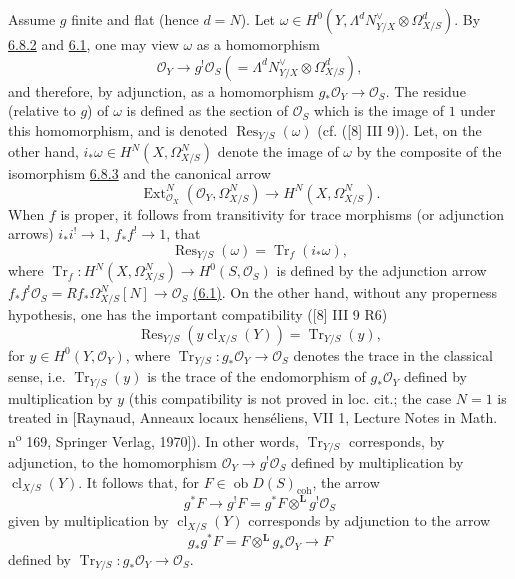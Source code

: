 \documentclass[11pt]{article}
\DeclareMathOperator{\Ext}{Ext}
\newcommand{\ob}{\operatorname{ob}}
\providecommand{\cl}{\operatorname{cl}}
\providecommand{\OO}{\mathcal{O}}
\providecommand{\LL}{\mathbf L}
\providecommand{\coh}{\mathrm{coh}}
\providecommand{\ob}{\operatorname{ob}}
\providecommand{\cl}{\operatorname{cl}}
\providecommand{\coh}{\mathrm{coh}}
\providecommand{\cl}{\operatorname{cl}}
\begin{document}
Assume $g$ finite and flat (hence $d=N$). Let $\omega\in H^0(Y,\Lambda^d N_{Y/X}^{\vee}\otimes\Omega^d_{X/S})$. By \hyperref[sga5:III:equation:6.8.2]{6.8.2} and \hyperref[sga5:III:subsection:6.1]{6.1}, one may view $\omega$ as a homomorphism
\[
\OO_Y\longrightarrow g^!\OO_S(=\Lambda^d N_{Y/X}^{\vee}\otimes\Omega^d_{X/S}),
\]
and therefore, by adjunction, as a homomorphism $g_*\OO_Y\to\OO_S$. The residue (relative to $g$) of $\omega$ is defined as the section of $\OO_S$ which is the image of $1$ under this homomorphism, and is denoted $\operatorname{Res}_{Y/S}(\omega)$ (cf. ([8] III 9)). Let, on the other hand, $i_*\omega\in H^N(X,\Omega^N_{X/S})$ denote the image of $\omega$ by the composite of the isomorphism \hyperref[sga5:III:equation:6.8.3]{6.8.3} and the canonical arrow
\[
\Ext^N_{\OO_X}(\OO_Y,\Omega^N_{X/S})\longrightarrow H^N(X,\Omega^N_{X/S}).
\]
When $f$ is proper, it follows from transitivity for trace morphisms (or adjunction arrows) $i_*i^!\to 1$, $f_*f^!\to 1$, that
\begin{equation}
\tag{6.8.4}\label{sga5:III:equation:6.8.4}
\operatorname{Res}_{Y/S}(\omega)=\operatorname{Tr}_f(i_*\omega),
\end{equation}
where $\operatorname{Tr}_f:H^N(X,\Omega^N_{X/S})\to H^0(S,\OO_S)$ is defined by the adjunction arrow $f_*f^!\OO_S=Rf_*\Omega^N_{X/S}[N]\to\OO_S$ \hyperref[sga5:III:subsection:6.1]{(6.1)}. On the other hand, without any properness hypothesis, one has the important compatibility ([8] III 9 R6)
\begin{equation}
\tag{6.8.5}\label{sga5:III:equation:6.8.5}
\operatorname{Res}_{Y/S}(y\cl_{X/S}(Y))=\operatorname{Tr}_{Y/S}(y),
\end{equation}
for $y\in H^0(Y,\OO_Y)$, where $\operatorname{Tr}_{Y/S}:g_*\OO_Y\to\OO_S$ denotes the trace in the classical sense, i.e. $\operatorname{Tr}_{Y/S}(y)$ is the trace of the endomorphism of $g_*\OO_Y$ defined by multiplication by $y$ (this compatibility is not proved in loc. cit.; the case $N=1$ is treated in [Raynaud, Anneaux locaux henséliens, VII 1, Lecture Notes in Math. n\textsuperscript{o} 169, Springer Verlag, 1970]). In other words, $\operatorname{Tr}_{Y/S}$ corresponds, by adjunction, to the homomorphism $\OO_Y\to g^!\OO_S$ defined by multiplication by $\cl_{X/S}(Y)$. It follows that, for $F\in\ob D(S)_{\coh}$, the arrow
\begin{equation}
\tag{6.8.6}\label{sga5:III:equation:6.8.6}
g^*F\longrightarrow g^!F=g^*F\otimes^{\LL}g^!\OO_S
\end{equation}
given by multiplication by $\cl_{X/S}(Y)$ corresponds by adjunction to the arrow
\begin{equation}
\tag{6.8.7}\label{sga5:III:equation:6.8.7}
g_*g^*F=F\otimes^{\LL}g_*\OO_Y\longrightarrow F
\end{equation}
defined by $\operatorname{Tr}_{Y/S}:g_*\OO_Y\to\OO_S$.
\end{document}
